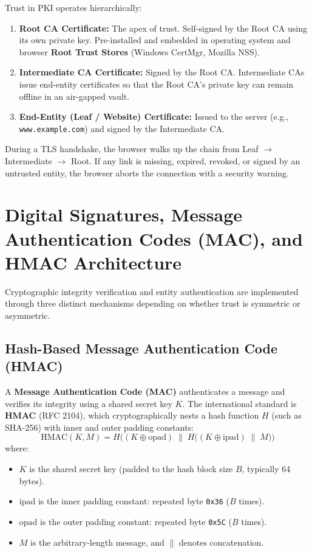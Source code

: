 Trust in PKI operates hierarchically:
\begin{enumerate}
\item \textbf{Root CA Certificate:} The apex of trust. Self-signed by the Root CA using its own private key. Pre-installed and embedded in operating system and browser \textbf{Root Trust Stores} (Windows CertMgr, Mozilla NSS).
\item \textbf{Intermediate CA Certificate:} Signed by the Root CA. Intermediate CAs issue end-entity certificates so that the Root CA's private key can remain offline in an air-gapped vault.
\item \textbf{End-Entity (Leaf / Website) Certificate:} Issued to the server (e.g., \texttt{www.example.com}) and signed by the Intermediate CA.
\end{enumerate}
During a TLS handshake, the browser walks up the chain from Leaf $\to$ Intermediate $\to$ Root. If any link is missing, expired, revoked, or signed by an untrusted entity, the browser aborts the connection with a security warning.

\newpage
\section{Digital Signatures, Message Authentication Codes (MAC), and HMAC Architecture}

Cryptographic integrity verification and entity authentication are implemented through three distinct mechanisms depending on whether trust is symmetric or asymmetric.

\subsection{Hash-Based Message Authentication Code (HMAC)}

A \textbf{Message Authentication Code (MAC)} authenticates a message and verifies its integrity using a shared secret key $K$. The international standard is \textbf{HMAC} (RFC 2104), which cryptographically nests a hash function $H$ (such as SHA-256) with inner and outer padding constants:
\[ \text{HMAC}(K, M) = H\Big( (K \oplus \text{opad}) \;\|\; H\big( (K \oplus \text{ipad}) \;\|\; M \big) \Big) \]
where:
\begin{itemize}
\item $K$ is the shared secret key (padded to the hash block size $B$, typically 64 bytes).
\item $\text{ipad}$ is the inner padding constant: repeated byte \texttt{0x36} ($B$ times).
\item $\text{opad}$ is the outer padding constant: repeated byte \texttt{0x5C} ($B$ times).
\item $M$ is the arbitrary-length message, and $\|$ denotes concatenation.
\end{itemize}


